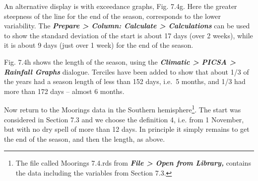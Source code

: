 \documentclass[
  letterpaper,
  DIV=11,
  numbers=noendperiod]{scrreprt}
\begin{document}
An alternative display is with exceedance graphs, Fig. 7.4g. Here the
greater steepness of the line for the end of the season, corresponds to
the lower variability. The \textbf{\emph{Prepare \textgreater{} Column:
Calculate \textgreater{} Calculations}} can be used to show the standard
deviation of the start is about 17 days (over 2 weeks), while it is
about 9 days (just over 1 week) for the end of the season.

Fig. 7.4h shows the length of the season, using the
\textbf{\emph{Climatic \textgreater{} PICSA \textgreater{} Rainfall
Graphs}} dialogue. Terciles have been added to show that about 1/3 of
the years had a season length of less than 152 days, i.e.~5 months, and
1/3 had more than 172 days -- almost 6 months.

Now return to the Moorings data in the Southern hemisphere\footnote{The
  file called Moorings 7.4.rds from \textbf{\emph{File \textgreater{}
  Open from Library,}} contains the data including the variables from
  Section 7.3.}. The start was considered in Section 7.3 and we choose
the definition 4, i.e. from 1 November, but with no dry spell of more
than 12 days. In principle it simply remains to get the end of the
season, and then the length, as above.
\end{document}
